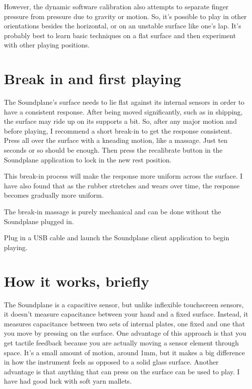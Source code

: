 However, the dynamic software calibration also attempts to separate finger pressure from pressure due to gravity or motion.  So, it’s possible to play in other orientations besides the horizontal, or on an unstable surface like one’s lap.  It's probably best to learn basic techniques on a flat surface and then experiment with other playing positions. 

\section{Break in and first playing}

The Soundplane's surface needs to lie flat against its internal sensors in order to have a consistent response.  After being moved significantly, such as in shipping, the surface may ride up on its supports a bit.  So, after any major motion and before playing, I recommend a short break-in to get the response consistent.  Press all over the surface with a kneading motion, like a massage.  Just ten seconds or so should be enough.  Then press the recalibrate button in the Soundplane application to lock in the new rest position. 

This break-in process will make the response more uniform across the surface.  I have also found that as the rubber stretches and wears over time, the response becomes gradually more uniform. 

The break-in massage is purely mechanical and can be done without the Soundplane plugged in.  

Plug in a USB cable and launch the Soundplane client application to begin playing.  

\section{How it works, briefly}

The Soundplane is a capacitive sensor, but unlike inflexible touchscreen sensors, it doesn't measure capacitance between your hand and a fixed surface.  Instead, it measures capacitance between two sets of internal plates, one fixed and one that you move by pressing on the surface.  One advantage of this approach is that you get tactile feedback because you are actually moving a sensor element through space.  It's a small amount of motion, around 1mm, but it makes a big difference in how the instrument feels as opposed to a solid glass surface.  Another advantage is that anything that can press on the surface can be used to play.  I have had good luck with soft yarn mallets. 

